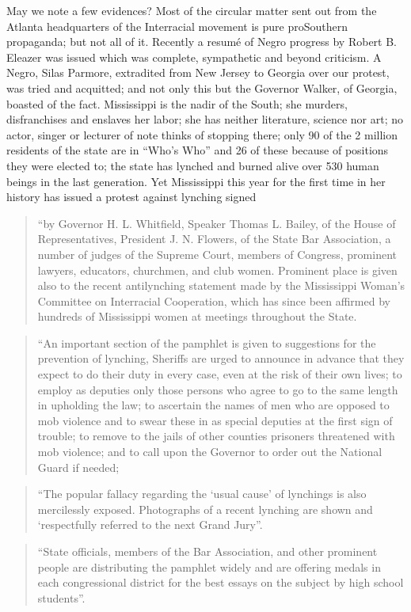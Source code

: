 \documentclass[letterpaper,10pt,english]{jupyterBook}
\begin{document}
\sphinxAtStartPar
May we note a few evidences? Most of the circular matter sent out from the Atlanta headquarters of the Inter\sphinxhyphen{}racial movement is pure pro\sphinxhyphen{}Southern propaganda; but not all of it. Recently a resumé of Negro progress by Robert B. Eleazer was issued which was complete, sympathetic and beyond criticism. A Negro, Silas Parmore, extradited from New Jersey to Georgia over our protest, was tried and acquitted; and not only this but the Governor Walker, of Georgia, boasted of the fact. Mississippi is the nadir of the South; she murders, disfranchises and enslaves her labor; she has neither literature, science nor art; no actor, singer or lecturer of note thinks of stopping there; only 90 of the 2 million residents of the state are in “Who’s Who” and 26 of these because of positions they were elected to; the state has lynched and burned alive over 530 human beings in the last generation. Yet Mississippi this year for the first time in her history has issued a protest against lynching signed
\begin{quote}

\sphinxAtStartPar
“by Governor H. L. Whitfield, Speaker Thomas L. Bailey, of the House of Representatives, President J. N. Flowers, of the State Bar Association, a number of judges of the Supreme Court, members of Congress, prominent lawyers, educators, churchmen, and club women. Prominent place is given also to the recent anti\sphinxhyphen{}lynching statement made by the Mississippi Woman’s Committee on Interracial Cooperation, which has since been affirmed by hundreds of Mississippi women at meetings throughout the State.
\end{quote}
\begin{quote}

\sphinxAtStartPar
“An important section of the pamphlet is given to suggestions for the prevention of lynching, Sheriffs are urged to announce in advance that they expect to do their duty in every case, even at the risk of their own lives; to employ as deputies only those persons who agree to go to the same length in upholding the law; to ascertain the names of men who are opposed to mob violence and to swear these in as special deputies at the first sign of trouble; to remove to the jails of other counties prisoners threatened with mob violence; and to call upon the Governor to order out the National Guard if needed;
\end{quote}
\begin{quote}

\sphinxAtStartPar
“The popular fallacy regarding the ‘usual cause’ of lynchings is also mercilessly exposed. Photographs of a recent lynching are shown and ‘respectfully referred to the next Grand Jury”.
\end{quote}
\begin{quote}

\sphinxAtStartPar
“State officials, members of the Bar Association, and other prominent people are distributing the pamphlet widely and are offering medals in each congressional district for the best essays on the subject by high school students”.
\end{quote}
\end{document}
